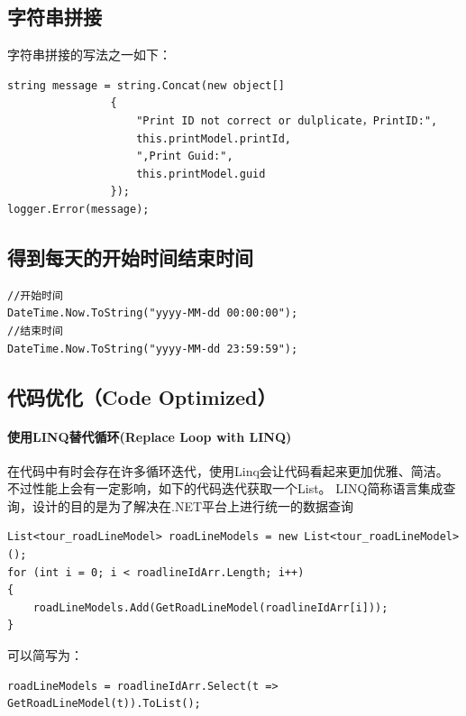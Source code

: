\documentclass{book}
\begin{document}
\subsection{字符串拼接}
	
字符串拼接的写法之一如下：	
	
\begin{lstlisting}
string message = string.Concat(new object[]
                {
                    "Print ID not correct or dulplicate，PrintID:",
                    this.printModel.printId,
                    ",Print Guid:",
                    this.printModel.guid
                });                        
logger.Error(message);
\end{lstlisting}	
	

\subsection{得到每天的开始时间结束时间}

\begin{lstlisting}[language={[Sharp]C}]
//开始时间
DateTime.Now.ToString("yyyy-MM-dd 00:00:00");
//结束时间
DateTime.Now.ToString("yyyy-MM-dd 23:59:59"); 
\end{lstlisting}

\subsection{代码优化（Code Optimized）}

\paragraph{使用LINQ替代循环(Replace Loop with LINQ)}

在代码中有时会存在许多循环迭代，使用Linq会让代码看起来更加优雅、简洁。
不过性能上会有一定影响，如下的代码迭代获取一个List。
LINQ简称语言集成查询，设计的目的是为了解决在.NET平台上进行统一的数据查询

\begin{lstlisting}[language={[Sharp]C}]
List<tour_roadLineModel> roadLineModels = new List<tour_roadLineModel>();
for (int i = 0; i < roadlineIdArr.Length; i++)
{
    roadLineModels.Add(GetRoadLineModel(roadlineIdArr[i]));
}
\end{lstlisting}

可以简写为：

\begin{lstlisting}[language={[Sharp]C}]
roadLineModels = roadlineIdArr.Select(t => GetRoadLineModel(t)).ToList();
\end{lstlisting}
\end{document}
